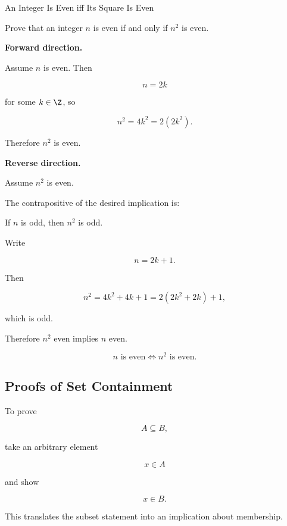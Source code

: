\begin{workedexamplebox}{An Integer Is Even iff Its Square Is Even}

Prove that an integer \(n\) is even if and only if \(n^2\) is even.

\textbf{Forward direction.}

Assume \(n\) is even. Then

\[ n=2k \]

for some \(k\in\Z\), so

\[ n^2=4k^2=2(2k^2). \]

Therefore \(n^2\) is even.

\textbf{Reverse direction.}

Assume \(n^2\) is even.

The contrapositive of the desired implication is:

\begin{center}
If \(n\) is odd, then \(n^2\) is odd.
\end{center}

Write

\[ n=2k+1. \]

Then

\[ n^2=4k^2+4k+1=2(2k^2+2k)+1, \]

which is odd.

Therefore \(n^2\) even implies \(n\) even.

\begin{answerbox}
\[ n\text{ is even}\Longleftrightarrow n^2\text{ is even}. \]
\end{answerbox}
\end{workedexamplebox}

\subsection{Proofs of Set Containment}
\label{subsec:proof-set-containment}

To prove

\[ A\subseteq B, \]

take an arbitrary element

\[ x\in A \]

and show

\[ x\in B. \]

This translates the subset statement into an implication about membership.

